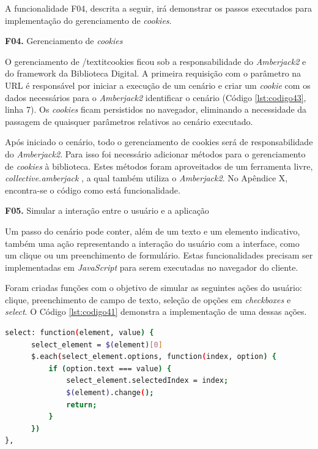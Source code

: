 A funcionalidade F04, descrita a seguir, irá demonstrar os passos executados para implementação do gerenciamento de \textit{cookies}.


\textbf{F04.} Gerenciamento de \textit{cookies}

O gerenciamento de /textit{cookies} ficou sob a responsabilidade do \textit{Amberjack2} e do framework da Biblioteca Digital. A primeira requisição com o parâmetro na URL é responsável por iniciar a execução de um cenário e criar um \textit{cookie} com os dados necessários para o \textit{Amberjack2} identificar o cenário (Código \ref{lst:codigo43}, linha 7). Os \textit{cookies} ficam persistidos no navegador, eliminando a necessidade da passagem de quaisquer parâmetros relativos ao cenário executado.

Após iniciado o cenário, todo o gerenciamento de cookies será de responsabilidade do \textit{Amberjack2}. Para isso foi necessário adicionar métodos para o gerenciamento de \textit{cookies} à biblioteca. Estes métodos foram aproveitados de um ferramenta livre, \textit{collective.amberjack} \cite{REDTURTLE}, a qual também utiliza o \textit{Amberjack2}. No Apêndice X, encontra-se o código como está funcionalidade.

\textbf{F05.} Simular a interação entre o usuário e a aplicação

Um passo do cenário pode conter, além de um texto e um elemento indicativo, também uma ação representando a interação do usuário com a interface, como um clique ou um preenchimento de formulário. Estas funcionalidades precisam ser implementadas em \textit{JavaScript} para serem executadas no navegador do cliente.

Foram criadas funções com o objetivo de simular as seguintes ações do usuário: clique, preenchimento de campo de texto, seleção de opções em \textit{checkboxes} e \textit{select}. O Código \ref{lst:codigo41} demonstra a implementação de uma dessas ações.

{\singlespace
\begin{lstlisting}[caption=Função para seleção de item em um \textit{select},language=bash,label={lst:codigo41}]
select: function(element, value) {
      select_element = $(element)[0]
      $.each(select_element.options, function(index, option) {
          if (option.text === value) {
              select_element.selectedIndex = index;
              $(element).change();
              return;
          }
      })
},
\end{lstlisting}
}

